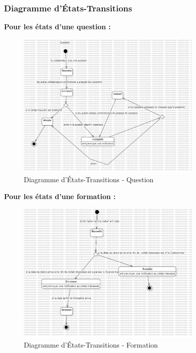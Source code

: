 \documentclass{article}
\begin{document}
            \subsubsection{Diagramme d'États-Transitions}
                \textbf{Pour les états d'une question :}
                \begin{figure}[h!]
                    \centering
                    \includegraphics[width=0.8\textwidth]{assets/diagrammes/jpg/StateMachine1!Question_0.jpg}
                    \caption{Diagramme d'États-Transitions - Question}
                \end{figure}
                \FloatBarrier
                \textbf{Pour les états d'une formation :}
                \begin{figure}[h!]
                    \centering
                    \includegraphics[width=0.8\textwidth]{assets/diagrammes/jpg/StateMachine2!Formation_1.jpg}
                    \caption{Diagramme d'États-Transitions - Formation}
                \end{figure}
                \FloatBarrier
            
\end{document}
